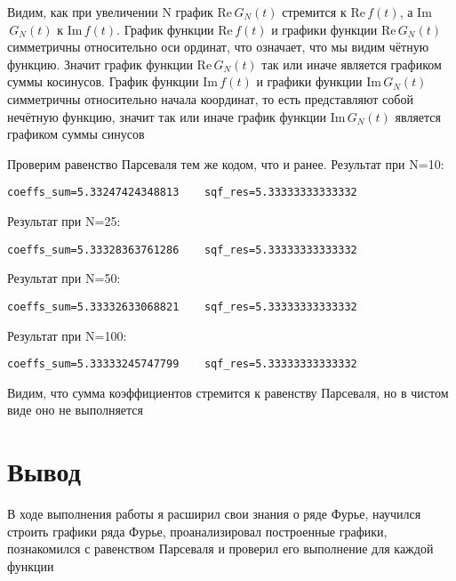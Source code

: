 \documentclass[a4paper, 16pt]{article}
\begin{document}
\noindent Видим, как при увеличении N график Re$\,G_N(t)$ стремится к Re$\,f(t)$,
а Im$\,G_N(t)$ к Im$\,f(t)$. График функции Re$\,f(t)$ и графики функции Re$\,G_N(t)$ симметричны 
относительно оси ординат, что означает, что мы видим чётную функцию. Значит
график функции Re$\,G_N(t)$ так или иначе является графиком суммы косинусов. График функции Im$\,f(t)$
и графики функции Im$\,G_N(t)$ симметричны относительно начала координат, то есть представляют собой
нечётную функцию, значит так или иначе график функции Im$\,G_N(t)$ является графиком суммы синусов


\newpage
\noindent Проверим равенство Парсеваля тем же кодом, что и ранее. Результат при N=10:
\begin{lstlisting}
coeffs_sum=5.33247424348813    sqf_res=5.33333333333332
\end{lstlisting}


\noindent Результат при N=25:
\begin{lstlisting}
coeffs_sum=5.33328363761286    sqf_res=5.33333333333332
\end{lstlisting}


\noindent Результат при N=50:
\begin{lstlisting}
coeffs_sum=5.33332633068821    sqf_res=5.33333333333332
\end{lstlisting}


\noindent Результат при N=100:
\begin{lstlisting}
coeffs_sum=5.33333245747799    sqf_res=5.33333333333332
\end{lstlisting}


\noindent Видим, что сумма коэффициентов стремится к равенству Парсеваля, но в чистом
виде оно не выполняется


\section{Вывод}
\noindent В ходе выполнения работы я расширил свои знания о ряде Фурье, научился
строить графики ряда Фурье, проанализировал построенные графики,
познакомился с равенством Парсеваля и проверил его выполнение для каждой функции
\end{document}
